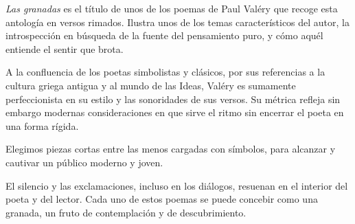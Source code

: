 \emph{Las granadas} es el título de unos de los poemas de Paul Valéry
que recoge esta antología en versos rimados. Ilustra unos de los temas
característicos del autor, la introspección en búsqueda de la fuente
del pensamiento puro, y cómo aquél entiende el sentir que brota.

A la confluencia de los poetas simbolistas y clásicos, por sus
referencias a la cultura griega antigua y al mundo de las Ideas,
Valéry es sumamente perfeccionista en su estilo y las sonoridades de
sus versos. Su métrica refleja sin embargo modernas consideraciones en
que sirve el ritmo sin encerrar el poeta en una forma rígida.

Elegimos piezas cortas entre las menos cargadas con símbolos, para
alcanzar y cautivar un público moderno y joven.

El silencio y las exclamaciones, incluso en los diálogos, resuenan en
el interior del poeta y del lector. Cada uno de estos poemas se puede
concebir como una granada, un fruto de contemplación y de
descubrimiento.
